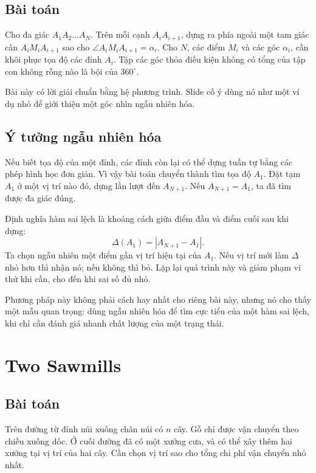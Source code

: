 \documentclass[11pt]{article}
\begin{document}
\subsection{Bài toán}

Cho đa giác \(A_1A_2\ldots A_N\). Trên mỗi cạnh \(A_iA_{i+1}\), dựng ra phía
ngoài một tam giác cân \(A_iM_iA_{i+1}\) sao cho
\(\angle A_iM_iA_{i+1}=\alpha_i\). Cho \(N\), các điểm \(M_i\) và các góc
\(\alpha_i\), cần khôi phục tọa độ các đỉnh \(A_i\). Tập các góc thỏa điều
kiện không có tổng của tập con không rỗng nào là bội của \(360^\circ\).

Bài này có lời giải chuẩn bằng hệ phương trình. Slide cố ý dùng nó như một
ví dụ nhỏ để giới thiệu một góc nhìn ngẫu nhiên hóa.

\subsection{Ý tưởng ngẫu nhiên hóa}

Nếu biết tọa độ của một đỉnh, các đỉnh còn lại có thể dựng tuần tự bằng các
phép hình học đơn giản. Vì vậy bài toán chuyển thành tìm tọa độ \(A_1\).
Đặt tạm \(A_1\) ở một vị trí nào đó, dựng lần lượt đến \(A_{N+1}\). Nếu
\(A_{N+1}=A_1\), ta đã tìm được đa giác đúng.

Định nghĩa hàm sai lệch là khoảng cách giữa điểm đầu và điểm cuối sau khi
dựng:
\[
  \Delta(A_1)=|A_{N+1}-A_1|.
\]
Ta chọn ngẫu nhiên một điểm gần vị trí hiện tại của \(A_1\). Nếu vị trí mới
làm \(\Delta\) nhỏ hơn thì nhận nó; nếu không thì bỏ. Lặp lại quá trình này
và giảm phạm vi thử khi cần, cho đến khi sai số đủ nhỏ.

Phương pháp này không phải cách hay nhất cho riêng bài này, nhưng nó cho thấy
một mẫu quan trọng: dùng ngẫu nhiên hóa để tìm cực tiểu của một hàm sai lệch,
khi chỉ cần đánh giá nhanh chất lượng của một trạng thái.

\section{Two Sawmills}

\subsection{Bài toán}

Trên đường từ đỉnh núi xuống chân núi có \(n\) cây. Gỗ chỉ được vận chuyển
theo chiều xuống dốc. Ở cuối đường đã có một xưởng cưa, và có thể xây thêm
hai xưởng tại vị trí của hai cây. Cần chọn vị trí sao cho tổng chi phí vận
chuyển nhỏ nhất.
\end{document}
